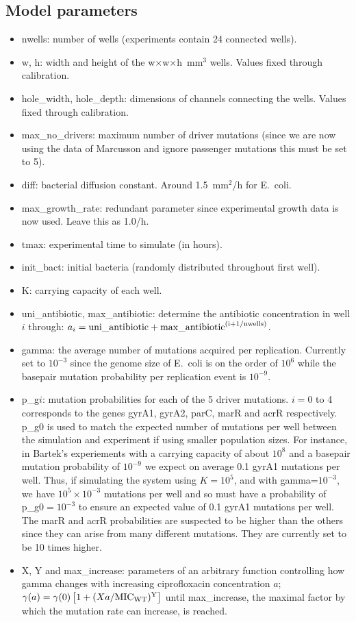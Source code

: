 \documentclass[a4paper,10pt]{article}
\begin{document}
\subsection{Model parameters}
\begin{itemize}
 \item nwells: number of wells (experiments contain 24 connected wells).
 \item w, h: width and height of the w$\times$w$\times$h~mm$^3$ wells. Values fixed through calibration.
 \item hole\_width, hole\_depth: dimensions of channels connecting the wells. Values fixed through calibration.
 \item max\_no\_drivers: maximum number of driver mutations (since we are now using the data of Marcusson \cite{} and ignore passenger mutations this must
 be set to 5).
 \item diff: bacterial diffusion constant. Around 1.5~mm$^2$/h for E.~coli.
 \item max\_growth\_rate: redundant parameter since experimental growth data is now used. Leave this as 1.0/h.
 \item tmax: experimental time to simulate (in hours).
 \item init\_bact: initial bacteria (randomly distributed throughout first well).
 \item K: carrying capacity of each well.
 \item uni\_antibiotic, max\_antibiotic: determine the antibiotic concentration in well $i$ through: 
 $a_i = \rm{uni\_antibiotic} + \rm{max\_antibiotic}^{(i+1/\rm{nwells})}$.
 \item gamma: the average number of mutations acquired per replication. Currently set to $10^{-3}$ since the genome size of E.~coli
 is on the order of $10^6$ while the basepair mutation probability per replication event is $10^{-9}$.
 \item p\_g$i$: mutation probabilities for each of the 5 driver mutations. $i=0$ to 4 corresponds to the genes
 gyrA1, gyrA2, parC, marR and acrR respectively. p\_g0 is used to match the expected number of mutations per well between
 the simulation and experiment if using smaller population sizes. For instance, in Bartek's experiements with a carrying
 capacity of about $10^8$ and a basepair mutation probability of $10^{-9}$ we expect on average 0.1 gyrA1 mutations per well. Thus,
 if simulating the system using $K=10^5$, and with gamma=$10^{-3}$, we have $10^5\times10^{-3}$ mutations per well and so must 
 have a probability of p\_g0$=10^{-3}$ to ensure an expected value of 0.1 gyrA1 mutations per well.
 The marR and acrR probabilities are suspected to be higher than the others since they can arise from many different mutations. They are currently set to be 10 times higher.\\
 \item X, Y and max\_increase: parameters of an arbitrary function controlling how gamma changes with increasing ciprofloxacin
 concentration $a$; $\gamma(a) = \gamma(0) \left[ 1 + (Xa/\rm{MIC_{WT}})^Y \right]$ until max\_increase, the maximal factor by which the
 mutation rate can increase, is reached.
\end{itemize}
\end{document}
